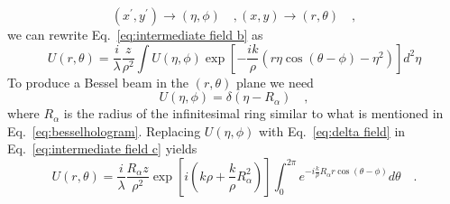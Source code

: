 \begin{subequations}
\begin{equation}
\left( x^{\prime},y^{\prime}\right) \longrightarrow \left( \eta , \phi \right) \quad ,
\end{equation}
\begin{equation}
 \left( x,y\right) \longrightarrow \left(r , \theta \right) \quad ,
\end{equation}
\end{subequations}
we can rewrite Eq.~\eqref{eq:intermediate field b} as
\begin{equation}
\label{eq:intermediate field c}
U(r ,\theta) = \frac{i}{\lambda} \frac{z}{\rho ^2}\int U(\eta ,\phi)\exp \left[ -\frac{ik}{\rho}\left( r \eta \cos (\theta - \phi) - \eta ^2 \right)\right]d^2\eta
\end{equation}
To produce a Bessel beam in the $(r,\theta)$ plane we need 
\begin{equation}
\label{eq:delta field}
U(\eta , \phi) = \delta (\eta - R_{\alpha}) \quad ,
\end{equation}
where $R_{\alpha}$ is the radius of the infinitesimal ring similar to what is mentioned in Eq.~\eqref{eq:besselhologram}. Replacing $U(\eta ,\phi)$ with Eq.~\eqref{eq:delta field} in Eq.~\eqref{eq:intermediate field c} yields
\begin{equation}
\label{eq:intermediate field d}
U(r ,\theta) = \frac{i}{\lambda} \frac{R_{\alpha}z}{\rho ^2}  \exp 
						\left[ i\left( k\rho + \frac{k}{\rho}R_{\alpha}^2\right)\right]
						\int _{0}^{2\pi}  e^{-i\frac{k}{\rho}R_{\alpha}r\cos (\theta - \phi)} d\theta \quad .
\end{equation}

